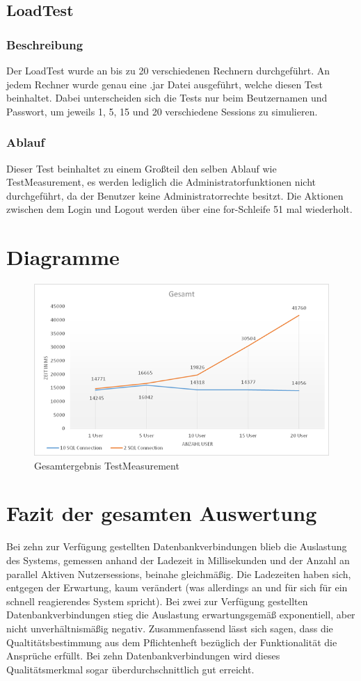 \subsection{LoadTest}

\subsubsection{Beschreibung}

Der LoadTest wurde an bis zu 20 verschiedenen Rechnern durchgeführt. An jedem Rechner wurde genau eine .jar Datei ausgeführt, welche diesen Test beinhaltet. Dabei unterscheiden sich die Tests nur beim Beutzernamen und Passwort, um jeweils 1, 5, 15 und 20 
verschiedene Sessions zu simulieren.

\subsubsection{Ablauf}

Dieser Test beinhaltet zu einem Großteil den selben Ablauf wie TestMeasurement, es werden lediglich die Administratorfunktionen nicht durchgeführt, da der Benutzer keine Administratorrechte besitzt. Die Aktionen zwischen dem Login und Logout werden über eine for-Schleife 51 mal wiederholt.

\section{Diagramme}

\begin{figure}[h]
\centering
\includegraphics[width=0.7\linewidth]{img/gesamt}
\caption{Gesamtergebnis TestMeasurement}
\label{fig:TestMeasurement}
\end{figure}

\section{Fazit der gesamten Auswertung}

Bei zehn zur Verfügung gestellten Datenbankverbindungen blieb die Auslastung des Systems, gemessen anhand der Ladezeit in Millisekunden und der Anzahl an parallel Aktiven Nutzersessions, beinahe gleichmäßig. Die Ladezeiten haben sich, entgegen der Erwartung, kaum verändert (was allerdings an und für sich für ein schnell reagierendes System spricht).
Bei zwei zur Verfügung gestellten Datenbankverbindungen stieg die Auslastung erwartungsgemäß exponentiell, aber nicht unverhältnismäßig negativ.
Zusammenfassend lässt sich sagen, dass die Qualtitätsbestimmung aus dem Pflichtenheft bezüglich der Funktionalität die Ansprüche erfüllt. Bei zehn Datenbankverbindungen wird dieses Qualitätsmerkmal sogar überdurchschnittlich gut erreicht.